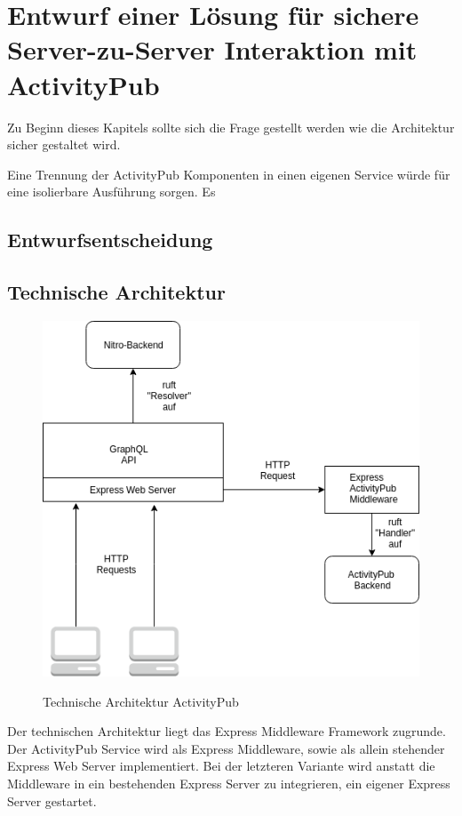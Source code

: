 
\chapter{Entwurf einer Lösung für sichere Server-zu-Server Interaktion mit ActivityPub}
Zu Beginn dieses Kapitels sollte sich die Frage gestellt werden wie die Architektur sicher gestaltet wird.

Eine Trennung der ActivityPub Komponenten in einen eigenen Service würde für eine isolierbare Ausführung sorgen. Es
\section{Entwurfsentscheidung}
\section{Technische Architektur}
	\begin{figure}[h]
		\centering
		\includegraphics[scale=0.5]{figures/technische-architektur-activitypub.png}
		\label{technische-architektur-activitypub}
		\caption{Technische Architektur ActivityPub}
	\end{figure}
	Der technischen Architektur liegt das Express Middleware Framework zugrunde. Der ActivityPub Service wird als Express Middleware, sowie als allein stehender Express Web Server implementiert. Bei der letzteren Variante wird anstatt die Middleware in ein bestehenden Express Server zu integrieren, ein eigener Express Server gestartet.\\
	
